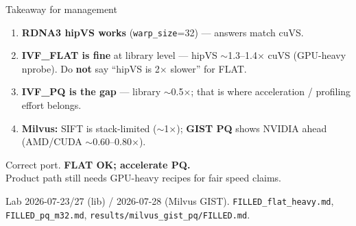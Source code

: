 \documentclass[aspectratio=169,11pt]{beamer}
\begin{document}
\begin{frame}{Takeaway for management}
  \begin{enumerate}
    \item \textbf{RDNA3 hipVS works} (\texttt{warp\_size}=32) --- answers match cuVS.
    \item \textbf{IVF\_FLAT is fine} at library level --- hipVS $\sim$1.3--1.4$\times$ cuVS
          (GPU-heavy nprobe). Do \textbf{not} say ``hipVS is 2$\times$ slower'' for FLAT.
    \item \textbf{IVF\_PQ is the gap} --- library $\sim$0.5$\times$; that is where
          acceleration / profiling effort belongs.
    \item \textbf{Milvus:} SIFT is stack-limited ($\sim$1$\times$);
          \textbf{GIST PQ} shows NVIDIA ahead (AMD/CUDA $\sim$0.60--0.80$\times$).
  \end{enumerate}

  \vspace{0.45em}
  \begin{center}
    \large
    Correct port. \textbf{FLAT OK; accelerate PQ.}\\[0.15em]
    {\normalsize Product path still needs GPU-heavy recipes for fair speed claims.}
  \end{center}

  \vspace{0.35em}
  {\footnotesize
  Lab 2026-07-23/27 (lib) / 2026-07-28 (Milvus GIST).
  \texttt{FILLED\_flat\_heavy.md}, \texttt{FILLED\_pq\_m32.md},
  \texttt{results/milvus\_gist\_pq/FILLED.md}.}
\end{frame}
\end{document}
